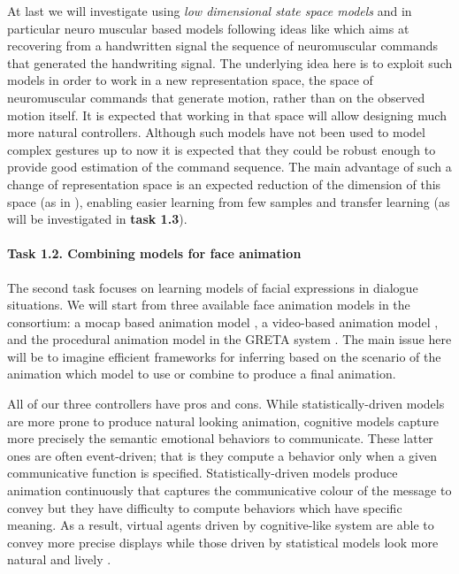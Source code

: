   At last we will investigate using {\it low dimensional state space models} and in particular neuro muscular based models following ideas like \cite{DBLP:conf/icfhr/FischerPOS14} which aims at recovering from a handwritten signal the sequence of neuromuscular commands that generated the handwriting signal. The underlying idea here is to exploit such models in order to work in a new representation space, the space of neuromuscular commands that generate motion, rather than on the observed motion itself. It is expected that working in that space will allow designing much more natural controllers.
  Although such models have not been used to model complex gestures up to now it is expected that they could be robust enough to provide good estimation of the command sequence. The main advantage of such a change of representation space is an expected reduction of the dimension of this space (as in \cite{DBLP:journals/pami/WangFH08}), enabling easier learning from few samples and transfer learning (as will be investigated in \textbf{task 1.3}). 
% 


\paragraph{Task 1.2. Combining models for face animation } 

The second task focuses on learning models of facial expressions in dialogue situations. We will start from three available face animation models in the consortium:  a mocap based animation model \cite{DBLP:conf/icassp/DingRAP13,Ding2014}, a video-based animation model \cite{Barbulescu2014}, and the procedural animation model in the GRETA system  \cite{greta}. The main issue here will be to imagine efficient frameworks for inferring based on the scenario of the animation which model to use or combine to produce a final animation.

All of our three controllers have pros and cons. While statistically-driven models are more prone to produce natural looking animation, cognitive
models capture more precisely the semantic emotional behaviors to communicate. These latter ones are often event-driven; that is they compute a behavior only when a given communicative function is specified. Statistically-driven models produce animation continuously that captures the communicative colour of the message to convey but they have difficulty to compute behaviors which have specific meaning. As a result, virtual agents driven by cognitive-like system are able to convey more precise displays while those driven by statistical models look more natural and lively \cite{DBLP:conf/iva/LeeM12}.

